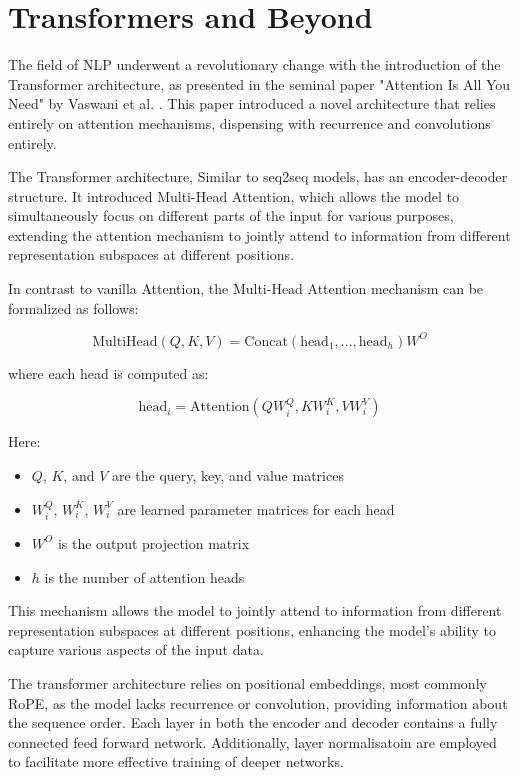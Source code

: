 \documentclass[a4paper, oneside]{discothesis}
\begin{document}
\section{Transformers and Beyond}
The field of NLP underwent a revolutionary change with the introduction of the Transformer architecture, as presented in the seminal paper "Attention Is All You Need" by Vaswani et al. \cite{vaswani2017attention}. This paper introduced a novel architecture that relies entirely on attention mechanisms, dispensing with recurrence and convolutions entirely.

The Transformer architecture, Similar to seq2seq models, has an encoder-decoder structure. It introduced Multi-Head Attention, which allows the model to simultaneously focus on different parts of the input for various purposes, extending the attention mechanism to jointly attend to information from different representation subspaces at different positions. 

In contrast to vanilla Attention, the Multi-Head Attention mechanism can be formalized as follows:

\begin{equation}
\text{MultiHead}(Q, K, V) = \text{Concat}(\text{head}_1, ..., \text{head}_h)W^O
\end{equation}

where each head is computed as:

\begin{equation}
\text{head}_i = \text{Attention}(QW_i^Q, KW_i^K, VW_i^V)
\end{equation}

Here:
\begin{itemize}
    \item $Q$, $K$, and $V$ are the query, key, and value matrices
    \item $W_i^Q$, $W_i^K$, $W_i^V$ are learned parameter matrices for each head
    \item $W^O$ is the output projection matrix
    \item $h$ is the number of attention heads
\end{itemize}

This mechanism allows the model to jointly attend to information from different representation subspaces at different positions, enhancing the model's ability to capture various aspects of the input data.

The transformer architecture relies on positional embeddings, most commonly RoPE, as the model lacks recurrence or convolution, providing information about the sequence order. Each layer in both the encoder and decoder contains a fully connected feed forward network. Additionally, layer normalisatoin are employed to facilitate more effective training of deeper networks.
\end{document}
